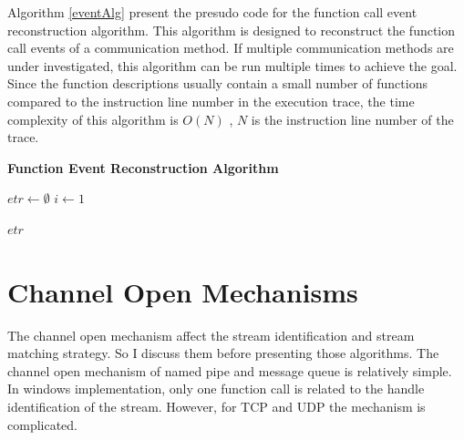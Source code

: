 Algorithm \ref{eventAlg} present the presudo code for the function call event reconstruction algorithm. This algorithm is designed to reconstruct the function call events of a communication method. If multiple communication methods are under investigated, this algorithm can be run multiple times to achieve the goal. Since the function descriptions usually contain a  small number of functions compared to the instruction line number in the execution trace, the time complexity of this algorithm is $O(N)$ , $N$ is the instruction line number of the trace.

\begin{algorithm}[H]
\DontPrintSemicolon
\caption{{\bf Function Event Reconstruction Algorithm} \label{eventAlg}}
\;
$etr \leftarrow \emptyset$\; 
$i \leftarrow 1$\;

\KwRet $etr$\;
\end{algorithm} 

\section{Channel Open Mechanisms}\label{mecha}
The channel open mechanism affect the stream identification and stream matching strategy. So I discuss them before presenting those algorithms. The channel open mechanism of named pipe and message queue is relatively simple. In windows implementation, only one function call is related to the handle identification of the stream. However, for TCP and UDP the mechanism is complicated.

